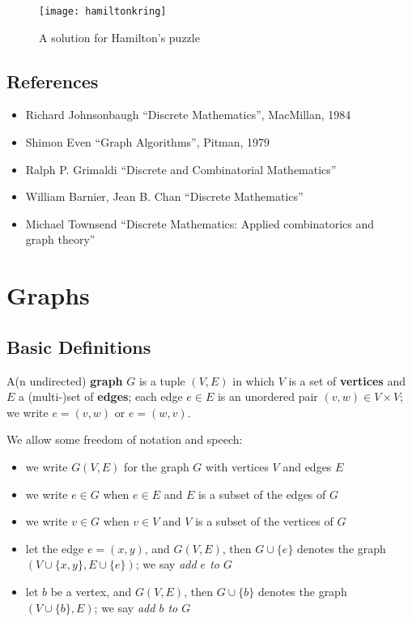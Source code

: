 \begin{figure}[ht]
	\centering
	\texttt{[image: hamiltonkring]}
	\caption{A solution for Hamilton's puzzle
	\label{hamiltonkring}}
\end{figure}

\section{References}

\begin{itemize}
\item
Richard Johnsonbaugh ``Discrete Mathematics'', MacMillan, 1984
\item
Shimon Even ``Graph Algorithms'', Pitman, 1979
\item
Ralph P. Grimaldi ``Discrete and Combinatorial Mathematics''
\item
William Barnier, Jean B. Chan ``Discrete Mathematics''
\item
Michael Townsend ``Discrete Mathematics: Applied combinatorics and \\
graph theory''
\end{itemize}



\chapter{Graphs}

\section{Basic Definitions}

\begin{definition}[Graph]
A(n undirected) \textbf{graph} $G$ is a tuple $(V,E)$ in which
$V$ is a set of \textbf{vertices} and $E$ a (multi-)set
of \textbf{edges}; each edge $e \in E$ is an unordered pair $(v,w) \in
V \times V$; we write $e = (v,w)$ or $e = (w,v)$.
\end{definition}

We allow some freedom of notation and speech:
\begin{itemize}
\item
we write $G(V,E)$ for the graph $G$ with vertices $V$ and edges $E$
\item
we write $e \in G$ when $e \in E$ and $E$ is a subset of the edges of $G$
\item
we write $v \in G$ when $v \in V$ and $V$ is a subset of the vertices of $G$
\item
let the edge $e = (x,y)$, and $G(V,E)$, then $G \cup \{e\}$ denotes
the graph $(V \cup \{x,y\},E \cup \{e\})$; we say {\em add $e$ to $G$}
\item
let $b$ be a vertex, and $G(V,E)$, then $G \cup \{b\}$ denotes the
graph $(V \cup \{b\},E )$; we say {\em add $b$ to $G$}
\end{itemize}

